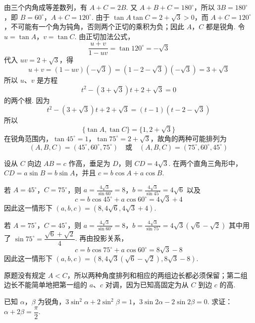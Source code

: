 \documentclass[UTF8,a4paper,oneside,11pt]{ctexbook}
\begin{document}
\begin{solution}
由三个内角成等差数列，有 \(A+C=2B\). 又 \(A+B+C=180^{\circ}\)，所以 \(3B=180^{\circ}\)，即
\(B=60^{\circ}\)，\(A+C=120^{\circ}\).
由于 \(\tan A\tan C=2+\sqrt{3}>0\)，而 \(A+C=120^{\circ}\)，不可能有一个角为钝角，否则两个正切的乘积为负；因此 \(A\)，\(C\) 都是锐角. 令 \(u=\tan A\)，\(v=\tan C\). 由正切加法公式，
\[
\frac{u+v}{1-uv}=\tan120^{\circ}=-\sqrt{3}
\]
代入 \(uv=2+\sqrt{3}\)，得
\[
u+v=(1-uv)(-\sqrt{3})=(1-2-\sqrt{3})(-\sqrt{3})=3+\sqrt{3}
\]
所以 \(u\)、\(v\) 是方程
\[
t^{2}-(3+\sqrt{3})t+2+\sqrt{3}=0
\]
的两个根. 因为
\[
t^{2}-(3+\sqrt{3})t+2+\sqrt{3}=(t-1)(t-2-\sqrt{3})
\]
所以
\[
\{\tan A,\tan C\}=\{1,2+\sqrt{3}\}
\]
在锐角范围内，\(\tan45^{\circ}=1\)，\(\tan75^{\circ}=2+\sqrt{3}\)，故角的两种可能排列为
\[
(A,B,C)=(45^{\circ},60^{\circ},75^{\circ})
\quad\text{或}\quad
(A,B,C)=(75^{\circ},60^{\circ},45^{\circ})
\]

设从 \(C\) 向边 \(AB=c\) 作高，垂足为 \(D\)，则 \(CD=4\sqrt{3}\). 在两个直角三角形中，\(CD=a\sin B=b\sin A\)，并且 \(c=b\cos A+a\cos B\).

若 \(A=45^{\circ}\)，\(C=75^{\circ}\)，则
\(a=\frac{4\sqrt{3}}{\sin60^{\circ}}=8\)，\(b=\frac{4\sqrt{3}}{\sin45^{\circ}}=4\sqrt{6}\)
以及
\[
c=b\cos45^{\circ}+a\cos60^{\circ}=4\sqrt{3}+4
\]
因此这一情形下 \((a,b,c)=(8,4\sqrt{6},4\sqrt{3}+4)\).

若 \(A=75^{\circ}\)，\(C=45^{\circ}\)，则
\(a=\frac{4\sqrt{3}}{\sin60^{\circ}}=8\)，\(b=\frac{4\sqrt{3}}{\sin75^{\circ}}=4\sqrt{3}\left(\sqrt{6}-\sqrt{2}\right)\)
其中用了 \(\sin75^{\circ}=\dfrac{\sqrt{6}+\sqrt{2}}{4}\). 再由投影关系，
\[
c=b\cos75^{\circ}+a\cos60^{\circ}=8\sqrt{3}-8
\]
因此这一情形下 \((a,b,c)=\left(8,4\sqrt{3}\left(\sqrt{6}-\sqrt{2}\right),8\sqrt{3}-8\right)\).

原题没有规定 \(A<C\)，所以两种角度排列和相应的两组边长都必须保留；第二组边长不能简单地把第一组的 \(a\)、\(c\) 对调，因为已知高固定为从 \(C\) 到边 \(c\) 的高.
\end{solution}

\begin{problem}
已知 \(\alpha\)，\(\beta\) 为锐角，\(3\sin^{2}\alpha+2\sin^{2}\beta=1\)，\(3\sin2\alpha-2\sin2\beta=0\). 求证：\(\alpha+2\beta=\dfrac{\pi}{2}\).
\end{problem}
\end{document}
